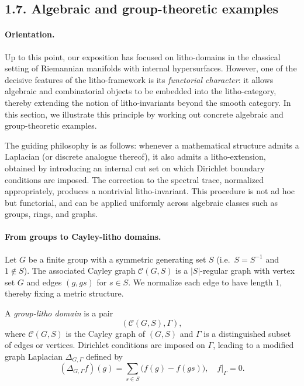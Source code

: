 \subsection*{1.7. Algebraic and group-theoretic examples}

\paragraph{Orientation.}
Up to this point, our exposition has focused on litho-domains in the
classical setting of Riemannian manifolds with internal hypersurfaces.
However, one of the decisive features of the litho-framework is its
\emph{functorial character}: it allows algebraic and combinatorial
objects to be embedded into the litho-category, thereby extending the
notion of litho-invariants beyond the smooth category. In this section,
we illustrate this principle by working out concrete algebraic and
group-theoretic examples.

\medskip

The guiding philosophy is as follows: whenever a mathematical structure
admits a Laplacian (or discrete analogue thereof), it also admits
a litho-extension, obtained by introducing an internal cut set
on which Dirichlet boundary conditions are imposed. The correction
to the spectral trace, normalized appropriately, produces a nontrivial
litho-invariant. This procedure is not ad hoc but functorial, and can
be applied uniformly across algebraic classes such as groups, rings,
and graphs.

\paragraph{From groups to Cayley-litho domains.}
Let $G$ be a finite group with a symmetric generating set $S$
(i.e.\ $S=S^{-1}$ and $1\notin S$). The associated Cayley graph
$\mathcal{C}(G,S)$ is a $|S|$-regular graph with vertex set $G$ and
edges $(g,gs)$ for $s\in S$.
We normalize each edge to have length $1$, thereby fixing a metric
structure.

\begin{definition}\label{def:grouplitho}
A \emph{group-litho domain} is a pair
\[
(\mathcal{C}(G,S),\Gamma),
\]
where $\mathcal{C}(G,S)$ is the Cayley graph of $(G,S)$
and $\Gamma$ is a distinguished subset of edges or vertices.
Dirichlet conditions are imposed on $\Gamma$, leading to a modified
graph Laplacian $\Delta_{G,\Gamma}$ defined by
\[
(\Delta_{G,\Gamma} f)(g) = \sum_{s\in S} \big(f(g)-f(gs)\big), \quad f|_{\Gamma}=0.
\]
\end{definition}

